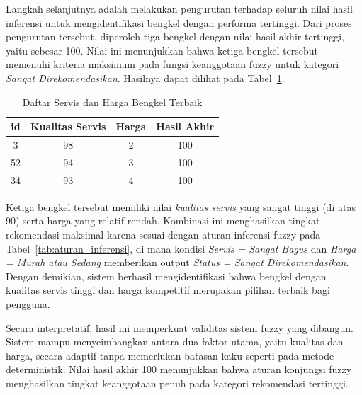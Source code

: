 \documentclass[12pt,a4paper]{article}
\theoremstyle{remark}
\begin{document}
Langkah selanjutnya adalah melakukan pengurutan terhadap seluruh nilai hasil inferensi untuk mengidentifikasi bengkel dengan performa tertinggi. Dari proses pengurutan tersebut, diperoleh tiga bengkel dengan nilai hasil akhir tertinggi, yaitu sebesar 100. Nilai ini menunjukkan bahwa ketiga bengkel tersebut memenuhi kriteria maksimum pada fungsi keanggotaan fuzzy untuk kategori \textit{Sangat Direkomendasikan}. Hasilnya dapat dilihat pada Tabel~\ref{tab:hasil_terbaik_kesimpulan}.

\begin{table}[H]
    \centering
    \caption{Daftar Servis dan Harga Bengkel Terbaik}
    \label{tab:hasil_terbaik_kesimpulan}
    \begin{tabular}{|c|c|c|c|}
        \hline
        \textbf{id} & \textbf{Kualitas Servis} & \textbf{Harga} & \textbf{Hasil Akhir} \\ \hline
        3           & 98                       & 2              & 100                  \\
        52          & 94                       & 3              & 100                  \\
        34          & 93                       & 4              & 100                  \\
        \hline
    \end{tabular}
\end{table}

Ketiga bengkel tersebut memiliki nilai \textit{kualitas servis} yang sangat tinggi (di atas 90) serta harga yang relatif rendah. Kombinasi ini menghasilkan tingkat rekomendasi maksimal karena sesuai dengan aturan inferensi fuzzy pada Tabel~\ref{tab:aturan_inferensi}, di mana kondisi \textit{Servis = Sangat Bagus} dan \textit{Harga = Murah atau Sedang} memberikan output \textit{Status = Sangat Direkomendasikan}. Dengan demikian, sistem berhasil mengidentifikasi bahwa bengkel dengan kualitas servis tinggi dan harga kompetitif merupakan pilihan terbaik bagi pengguna.

Secara interpretatif, hasil ini memperkuat validitas sistem fuzzy yang dibangun. Sistem mampu menyeimbangkan antara dua faktor utama, yaitu kualitas dan harga, secara adaptif tanpa memerlukan batasan kaku seperti pada metode deterministik. Nilai hasil akhir 100 menunjukkan bahwa aturan konjungsi fuzzy menghasilkan tingkat keanggotaan penuh pada kategori rekomendasi tertinggi.


\printbibliography[title={Referensi}]
\end{document}
